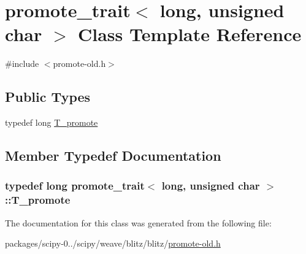 \hypertarget{classpromote__trait_3_01long_00_01unsigned_01char_01_4}{}\section{promote\+\_\+trait$<$ long, unsigned char $>$ Class Template Reference}
\label{classpromote__trait_3_01long_00_01unsigned_01char_01_4}


{\ttfamily \#include $<$promote-\/old.\+h$>$}

\subsection*{Public Types}
\begin{DoxyCompactItemize}
\item 
typedef long \hyperlink{classpromote__trait_3_01long_00_01unsigned_01char_01_4_ad16cd2381c1436bec85361fa732e2dfe}{T\+\_\+promote}
\end{DoxyCompactItemize}


\subsection{Member Typedef Documentation}
\hypertarget{classpromote__trait_3_01long_00_01unsigned_01char_01_4_ad16cd2381c1436bec85361fa732e2dfe}{}
\subsubsection[{T\+\_\+promote}]{\setlength{\rightskip}{0pt plus 5cm}typedef long {\bf promote\+\_\+trait}$<$ long, unsigned char $>$\+::{\bf T\+\_\+promote}}\label{classpromote__trait_3_01long_00_01unsigned_01char_01_4_ad16cd2381c1436bec85361fa732e2dfe}


The documentation for this class was generated from the following file\+:\begin{DoxyCompactItemize}
\item 
packages/scipy-\/0../scipy/weave/blitz/blitz/\hyperlink{promote-old_8h}{promote-\/old.\+h}\end{DoxyCompactItemize}
